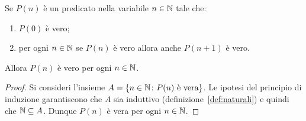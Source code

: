 \begin{theorem}
Se $P(n)$ è un predicato nella variabile $n\in \mathbb N$ tale che:
\begin{enumerate}
\item $P(0)$ è vero;
\item per ogni $n\in \mathbb N$ se $P(n)$ è vero allora anche $P(n+1)$ è vero.
\end{enumerate}
Allora $P(n)$ è vero per ogni $n\in \mathbb N$.
\end{theorem}
%
\begin{proof}
Si consideri l'insieme $A = {\left\{ n \in \mathbb N\colon P(n) \text{ è vera} \right\}}$.
Le ipotesi del principio di induzione garantiscono che $A$ sia induttivo
(definizione~\ref{def:naturali})
e quindi che $\mathbb N \subseteq A$. Dunque $P(n)$ è vera per ogni $n\in \mathbb N$.
\end{proof}

